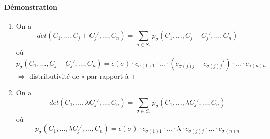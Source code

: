 \paragraph{Démonstration} 
\begin{enumerate}
  \item On a
    $$det(C_1, \ldots, C_j + C_j', \ldots, C_n) = \sum_{\sigma \in S_n} p_\sigma(C_1, \ldots, C_j + C_j' , \ldots, C_n)$$
    où
    $$ p_{\sigma}(C_1, \ldots, C_j + C_j', \ldots, C_n) = \epsilon(\sigma) \cdot c_{\sigma(1) 1} \cdot \ldots \cdot (c_{\sigma(j) j} + c_{\sigma(j) j}') \cdot \ldots \cdot c_{\sigma(n) n}$$
    $\Rightarrow$ distributivité de $\circ$ par rapport à $+$
   
  \item On a
    $$det(C_1, \ldots, \lambda C_j', \ldots, C_n) = \sum_{\sigma \in S_n} p_\sigma(C_1, \ldots, \lambda C_j' , \ldots, C_n)$$
    où
    $$ p_{\sigma}(C_1, \ldots, \lambda C_j', \ldots, C_n) = \epsilon(\sigma) \cdot c_{\sigma(1) 1} \cdot \ldots \cdot \lambda \cdot c_{\sigma(j) j}  \cdot \ldots \cdot c_{\sigma(n) n}$$


\end{enumerate}
